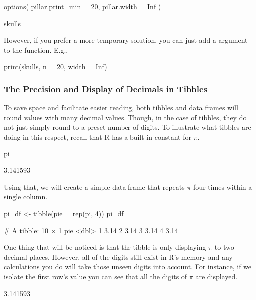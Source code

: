 \begin{inR}
options(
  pillar.print_min = 20,
  pillar.width = Inf
)

skulls
\end{inR}

\vspace{1em}

\noindent
However, if you prefer a more temporary solution, you can just add a  argument to the  function. E.g., 

\begin{inR}
print(skulls, n = 20, width = Inf)
\end{inR}

\vspace{1em}

\subsubsection{The Precision and Display of Decimals in Tibbles}
\label{sec:sig_digs}

To save space and facilitate easier reading, both tibbles and data frames will round values with many decimal values. Though, in the case of tibbles, they do not just simply round to a preset number of digits.  To illustrate what tibbles are doing in this respect, recall that R has a built-in constant for $\pi$.

\begin{inR}
pi
\end{inR}
\begin{outR}
[1] 3.141593
\end{outR}

\noindent
Using that, we will create a simple data frame that repeats $\pi$ four times within a single column.

\begin{inR}
pi_df <- tibble(pie = rep(pi, 4))
pi_df
\end{inR}
\begin{outR}
# A tibble: 10 × 1
     pie
   <dbl>
 1  3.14
 2  3.14
 3  3.14
 4  3.14
\end{outR}

\noindent
One thing that will be noticed is that the tibble is only displaying $\pi$ to two decimal places. However, all of the digits still exist in R's memory and any calculations you do will take those unseen digits into account. For instance, if we isolate the first row's value you can see that all the digits of $\pi$ are displayed.

\begin{outR}
[1] 3.141593
\end{outR}

